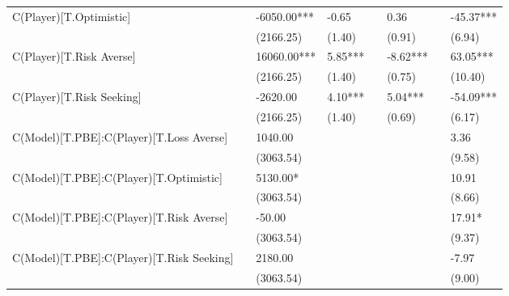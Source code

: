 \begin{table}
\begin{center}
\begin{tabular}{llllllll}
C(Player)[T.Optimistic]                    &              & -6050.00*** & -0.65     &            & 0.36        &                & -45.37***        \\
                                           &              & (2166.25)   & (1.40)    &            & (0.91)      &                & (6.94)           \\
C(Player)[T.Risk Averse]                   &              & 16060.00*** & 5.85***   &            & -8.62***    &                & 63.05***         \\
                                           &              & (2166.25)   & (1.40)    &            & (0.75)      &                & (10.40)          \\
C(Player)[T.Risk Seeking]                  &              & -2620.00    & 4.10***   &            & 5.04***     &                & -54.09***        \\
                                           &              & (2166.25)   & (1.40)    &            & (0.69)      &                & (6.17)           \\
C(Model)[T.PBE]:C(Player)[T.Loss Averse]   &              & 1040.00     &           &            &             &                & 3.36             \\
                                           &              & (3063.54)   &           &            &             &                & (9.58)           \\
C(Model)[T.PBE]:C(Player)[T.Optimistic]    &              & 5130.00*    &           &            &             &                & 10.91            \\
                                           &              & (3063.54)   &           &            &             &                & (8.66)           \\
C(Model)[T.PBE]:C(Player)[T.Risk Averse]   &              & -50.00      &           &            &             &                & 17.91*           \\
                                           &              & (3063.54)   &           &            &             &                & (9.37)           \\
C(Model)[T.PBE]:C(Player)[T.Risk Seeking]  &              & 2180.00     &           &            &             &                & -7.97            \\
                                           &              & (3063.54)   &           &            &             &                & (9.00)           \\

\end{tabular}
\end{center}
\end{table}

